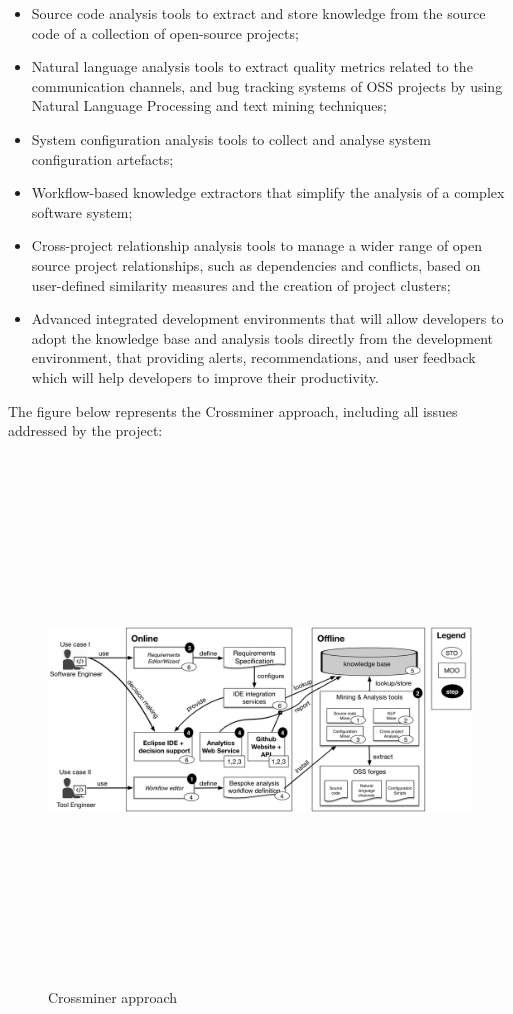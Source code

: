\begin{itemize}
\item Source code analysis tools to extract and store knowledge from the source code of a collection of open-source projects;
\item Natural language analysis tools to extract quality metrics related to the communication channels, and bug tracking systems of OSS projects by using Natural Language Processing and text mining techniques;
\item System configuration analysis tools to collect and analyse system configuration artefacts;
\item Workflow-based knowledge extractors that simplify the analysis of a complex software system;
\item Cross-project relationship analysis tools to manage a wider range of open source project relationships, such as dependencies and conflicts, based on user-defined similarity measures and the creation of project clusters;
\item Advanced integrated development environments that will allow developers to adopt the  knowledge base and analysis tools directly from the development environment, that providing alerts, recommendations, and user feedback which will help developers to improve their productivity.
\end{itemize}
The figure below represents the Crossminer approach, including all issues addressed by the project:\\


\begin{figure}[!h]
\includegraphics[width=14cm,height=14cm,keepaspectratio]{images/crossminer.png}
\centering
\caption{Crossminer approach}
\label{fig:cmd}
\end{figure}

